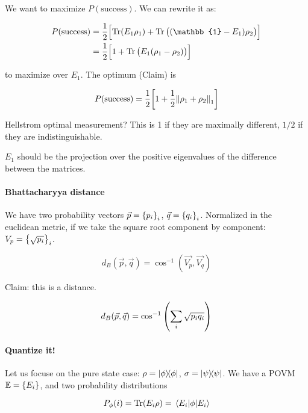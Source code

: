 We want to maximize \(P(\text{success})\). We can rewrite it as:

\begin{align}
  P(\text{success}) &= \frac{1}{2} \qty[\Tr(E_1 \rho_1) + \Tr\qty((\mathbb{1} - E_1) \rho_2)] \\
  &= \frac{1}{2}\qty[1 + \Tr \qty(E_1 (\rho_1 - \rho_2))]
\end{align}

to maximize over $E_1$. The optimum (Claim) is

\begin{equation}
  P(\text{success}) = \frac{1}{2}\qty[1 + \frac{1}{2} \norm{\rho_1 + \rho_2}_1]
\end{equation}

Hellstrom optimal measurement?
This is 1 if they are maximally different, $1/2$ if they are indistinguishable.

$E_1$ should be the projection over the positive eigenvalues of the difference between the matrices.

\paragraph{Bhattacharyya distance}

We have two probability vectors \(\vec{p} = \qty{p_i}_i\), \(\vec{q} = \qty{q_i}_i\).
Normalized in the euclidean metric, if we take the square root component by component: \(V_p = \qty{\sqrt{p_i}}_i\).

\begin{equation}
  d_B (\vec{p}, \vec{q}) = \cos^{-1} (\vec{V_p}, \vec{V_q})
\end{equation}

Claim: this is a distance.

\begin{equation}
  d_B (\vec{p}, \vec{q}) = \cos^{-1} \qty(\sum_i \sqrt{p_i q_i})
\end{equation}

\paragraph{Quantize it!}

Let us focuse on the pure state case: \(\rho = \ketbra{\phi}\), \(\sigma = \ketbra{\psi}\).
We have a POVM \(\mathbb{E} = \qty{E_i}\), and two probability distributions

\begin{equation}
  P_\phi (i) = \Tr (E_i \rho) = \ev{\phi}{E_i}
\end{equation}

